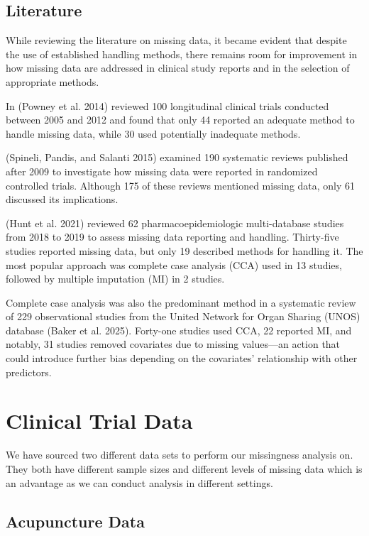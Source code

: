 \documentclass{article}
\begin{document}
\subsection{Literature}\label{literature}

While reviewing the literature on missing data, it became evident that
despite the use of established handling methods, there remains room for
improvement in how missing data are addressed in clinical study reports
and in the selection of appropriate methods.

In (Powney et al. 2014) reviewed 100 longitudinal clinical trials
conducted between 2005 and 2012 and found that only 44 reported an
adequate method to handle missing data, while 30 used potentially
inadequate methods.

(Spineli, Pandis, and Salanti 2015) examined 190 systematic reviews
published after 2009 to investigate how missing data were reported in
randomized controlled trials. Although 175 of these reviews mentioned
missing data, only 61 discussed its implications.

(Hunt et al. 2021) reviewed 62 pharmacoepidemiologic multi-database
studies from 2018 to 2019 to assess missing data reporting and handling.
Thirty-five studies reported missing data, but only 19 described methods
for handling it. The most popular approach was complete case analysis
(CCA) used in 13 studies, followed by multiple imputation (MI) in 2
studies.

Complete case analysis was also the predominant method in a systematic
review of 229 observational studies from the United Network for Organ
Sharing (UNOS) database (Baker et al. 2025). Forty-one studies used CCA,
22 reported MI, and notably, 31 studies removed covariates due to
missing values---an action that could introduce further bias depending
on the covariates' relationship with other predictors.

\section{Clinical Trial Data}\label{clinical-trial-data}

We have sourced two different data sets to perform our missingness
analysis on. They both have different sample sizes and different levels
of missing data which is an advantage as we can conduct analysis in
different settings.

\subsection{Acupuncture Data}\label{acupuncture-data}
\end{document}
